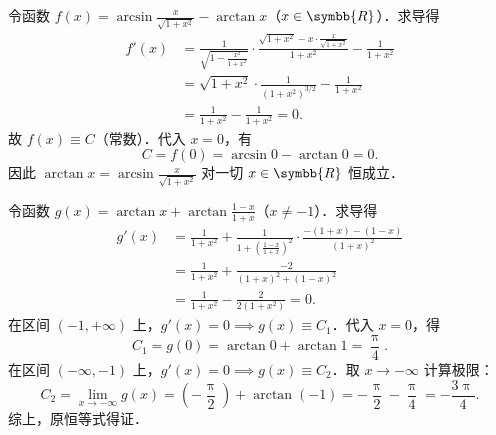 \begin{myproof}

    令函数 $f(x) = \arcsin \frac{x}{\sqrt{1+x^2}} - \arctan x$（$x \in \symbb{R}$）．求导得
    \begin{equation}
        \begin{aligned}
            f'(x) & = \frac{1}{\sqrt{1 - \frac{x^2}{1+x^2}}} \cdot \frac{\sqrt{1+x^2} - x \cdot \frac{x}{\sqrt{1+x^2}}}{1+x^2} - \frac{1}{1+x^2} \\
                  & = \sqrt{1+x^2} \cdot \frac{1}{(1+x^2)^{3/2}} - \frac{1}{1+x^2}                                                               \\
                  & = \frac{1}{1+x^2} - \frac{1}{1+x^2} = 0.
        \end{aligned}
    \end{equation}
    故 $f(x) \equiv C$（常数）．代入 $x = 0$，有
    \begin{equation}
        C = f(0) = \arcsin 0 - \arctan 0 = 0.
    \end{equation}
    因此 $\arctan x = \arcsin \frac{x}{\sqrt{1+x^2}}$ 对一切 $x \in \symbb{R}$ 恒成立．


    令函数 $g(x) = \arctan x + \arctan \frac{1-x}{1+x}$（$x \neq -1$）．求导得
    \begin{equation}
        \begin{aligned}
            g'(x) & = \frac{1}{1+x^2} + \frac{1}{1 + \left(\frac{1-x}{1+x}\right)^2} \cdot \frac{-(1+x) - (1-x)}{(1+x)^2} \\
                  & = \frac{1}{1+x^2} + \frac{-2}{(1+x)^2 + (1-x)^2}                                                      \\
                  & = \frac{1}{1+x^2} - \frac{2}{2(1+x^2)} = 0.
        \end{aligned}
    \end{equation}
    在区间 $(-1, +\infty)$ 上，$g'(x) = 0 \implies g(x) \equiv C_1$．代入 $x = 0$，得
    \begin{equation}
        C_1 = g(0) = \arctan 0 + \arctan 1 = \frac{\uppi}{4}.
    \end{equation}
    在区间 $(-\infty, -1)$ 上，$g'(x) = 0 \implies g(x) \equiv C_2$．取 $x \to -\infty$ 计算极限：
    \begin{equation}
        C_2 = \lim_{x\to -\infty} g(x) = \left( -\frac{\uppi}{2} \right) + \arctan(-1) = -\frac{\uppi}{2} - \frac{\uppi}{4} = -\frac{3\uppi}{4}.
    \end{equation}
    综上，原恒等式得证．
\end{myproof}

